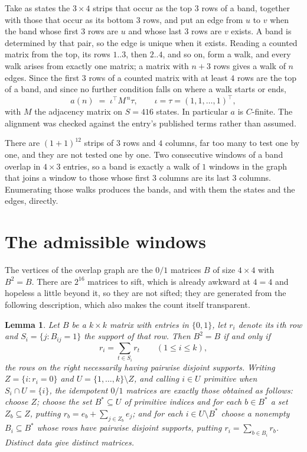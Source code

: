 \documentclass[11pt,a4paper]{article}
\theoremstyle{plain}
\newtheorem{lemma}[theorem]{Lemma}
\theoremstyle{definition}
\begin{document}
Take as states the $3\times4$ strips that occur as the top $3$ rows of a band,
together with those that occur as its bottom $3$ rows, and put an edge from $u$ to $v$
when the band whose first $3$ rows are $u$ and whose last $3$ rows are $v$ exists.
A band is determined by that pair, so the edge is unique when it exists. Reading a counted
matrix from the top, its rows $1..3$, then $2..4$, and so on, form a walk, and every
walk arises from exactly one matrix; a matrix with $n+3$ rows gives a walk of $n$ edges.
Since the first $3$ rows of a counted matrix with at least $4$ rows are the top of a
band, and since no further condition falls on where a walk starts or ends,
\[
a(n)\;=\;\iota^{\!\top}M^{\,n}\tau ,\qquad \iota=\tau=(1,1,\dots,1)^{\!\top},
\]
with $M$ the adjacency matrix on $S=416$ states. In particular $a$ is $C$-finite. The
alignment was checked against the entry's published terms rather than assumed.

There are $(1 + 1)^{12}$ strips of $3$ rows and $4$ columns, far too
many to test one by one, and they are not tested one by one. Two consecutive windows of a band
overlap in $4\times3$ entries, so a band is exactly a walk of $1$ windows in
the graph that joins a window to those whose first $3$ columns are its last $3$
columns. Enumerating those walks produces the bands, and with them the states and the edges,
directly.

\section{The admissible windows}

The vertices of the overlap graph are the $0/1$ matrices $B$ of size $4\times4$ with
$B^2=B$. There are $2^{16}$ matrices to sift, which is already awkward at $4=4$ and
hopeless a little beyond it, so they are not sifted; they are generated from the following
description, which also makes the count itself transparent.

\begin{lemma}\label{lem:idem}
Let $B$ be a $k\times k$ matrix with entries in $\{0,1\}$, let $r_i$ denote its $i$th row and
$S_i=\{j:B_{ij}=1\}$ the support of that row. Then $B^2=B$ if and only if
\[
r_i=\sum_{t\in S_i}r_t \qquad (1\le i\le k),
\]
the rows on the right necessarily having pairwise disjoint supports. Writing
$Z=\{i:r_i=0\}$ and $U=\{1,\dots,k\}\setminus Z$, and calling $i\in U$ \emph{primitive}
when $S_i\cap U=\{i\}$, the idempotent $0/1$ matrices are exactly those obtained as follows:
choose $Z$; choose the set $B^{\ast}\subseteq U$ of primitive indices and for each
$b\in B^{\ast}$ a set $Z_b\subseteq Z$, putting $r_b=e_b+\sum_{j\in Z_b}e_j$; and for each
$i\in U\setminus B^{\ast}$ choose a nonempty $B_i\subseteq B^{\ast}$ whose rows have
pairwise disjoint supports, putting $r_i=\sum_{b\in B_i}r_b$. Distinct data give distinct
matrices.
\end{lemma}
\end{document}
